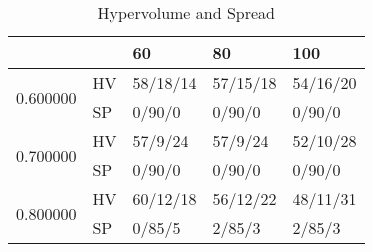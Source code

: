 \begin{table}
\caption{Hypervolume and Spread}
\begin{tabular}{lllll}
\toprule
 &  & 60 & 80 & 100 \\
\midrule
\multirow[t]{2}{*}{0.600000} & HV & 58/18/14 & 57/15/18 & 54/16/20 \\
 & SP & 0/90/0 & 0/90/0 & 0/90/0 \\
\cline{1-5}
\multirow[t]{2}{*}{0.700000} & HV & 57/9/24 & 57/9/24 & 52/10/28 \\
 & SP & 0/90/0 & 0/90/0 & 0/90/0 \\
\cline{1-5}
\multirow[t]{2}{*}{0.800000} & HV & 60/12/18 & 56/12/22 & 48/11/31 \\
 & SP & 0/85/5 & 2/85/3 & 2/85/3 \\
\cline{1-5}
\bottomrule
\end{tabular}
\end{table}

